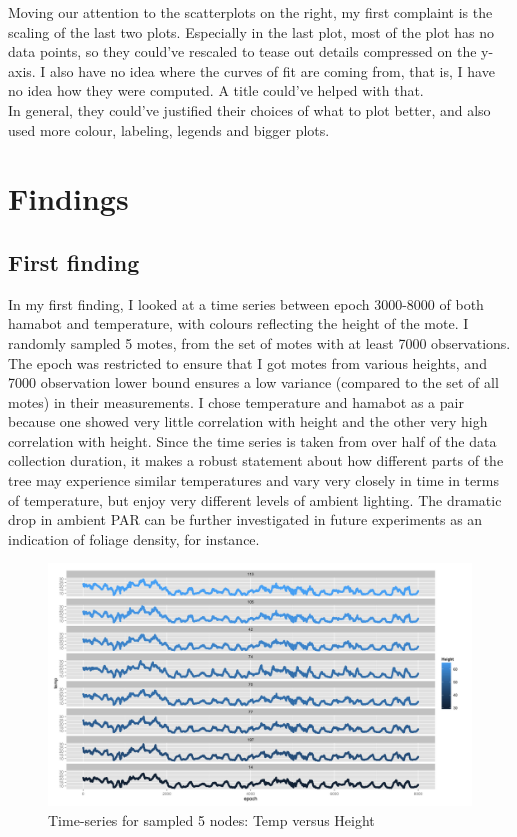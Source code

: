 \documentclass[english]{article}\usepackage[]{graphicx}\usepackage[]{color}
\begin{document}
Moving our attention to the scatterplots on the right, my first complaint is the scaling of the last two plots.  Especially in the last plot, most of the plot has no data points, so they could've rescaled to tease out details compressed on the y-axis.  I also have no idea where the curves of fit are coming from, that is, I have no idea how they were computed.  A title could've helped with that.  \\

In general, they could've justified their choices of what to plot better, and also used more colour, labeling, legends and bigger plots.  

\section{Findings}
 
\subsection{First finding}

In my first finding, I looked at a time series between epoch 3000-8000 of both hamabot and temperature, with colours reflecting the height of the mote.  I randomly sampled 5 motes, from the set of motes with at least 7000 observations.  The epoch was restricted to ensure that I got motes from various heights, and 7000 observation lower bound ensures a low variance (compared to the set of all motes) in their measurements.  I chose temperature and hamabot as a pair because one showed very little correlation with height and the other very high correlation with height.  Since the time series is taken from over half of the data collection duration, it makes a robust statement about how different parts of the tree may experience similar temperatures and vary very closely in time in terms of temperature, but enjoy very different levels of ambient lighting.  The dramatic drop in ambient PAR can be further investigated in future experiments as an indication of foliage density, for instance.  


\begin{figure}[H]

\includegraphics[width=\linewidth]{tempheightepoch}
\caption{Time-series for sampled 5 nodes: Temp versus Height}

\end{figure}
\end{document}
